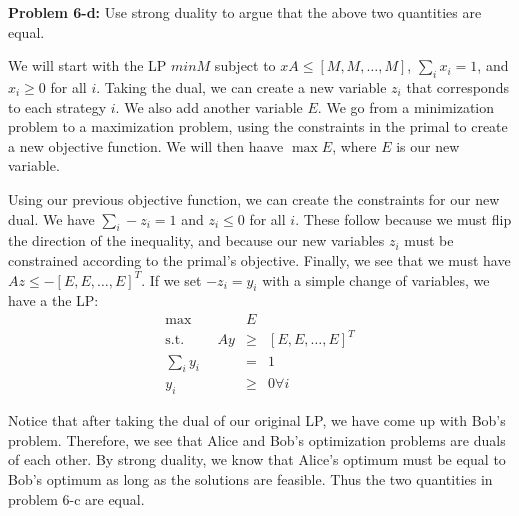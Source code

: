 \documentclass[psamsfonts]{amsart}
\newenvironment{sol}{\vspace{0.25cm}{\large \bfseries Solution:}}{\qedsymbol}
\newenvironment{prob}[1]{\begin{framed}{\large \bfseries Problem #1:}}{\end{framed}}
\begin{document}
\begin{prob}{6-d}
Use strong duality to argue that the above two quantities are equal.
\end{prob}
\begin{sol}
We will start with the LP $min M$ subject to $xA \leq [M, M, \ldots, M]$, $\sum_{i} x_i = 1$, and $x_i \geq 0$ for all $i$. Taking the dual, we can create a new variable $z_i$ that corresponds to each strategy $i$. We also add another variable $E$. We go from a minimization problem to a maximization problem, using the constraints in the primal to create a new objective function. We will then haave $\max E$, where $E$ is our new variable. 

Using our previous objective function, we can create the constraints for our new dual. We have $\sum_{i} - z_i = 1$ and $z_i \leq 0$ for all $i$. These follow because we must flip the direction of the inequality, and because our new variables $z_i$ must be constrained according to the primal's objective. Finally, we see that we must have $Az \leq - [E, E, \ldots, E]^T$. If we set $-z_i = y_i$ with a simple change of variables, we have a the LP:
\begin{eqnarray}
\max &E& \\
\text{s.t.} \hspace{1cm} Ay &\geq& [E, E, \ldots, E]^T \\
\sum_{i} y_i &=& 1 \\
y_i &\geq& 0 \forall i
\end{eqnarray}

Notice that after taking the dual of our original LP, we have come up with Bob's problem. Therefore, we see that Alice and Bob's optimization problems are duals of each other. By strong duality, we know that Alice's optimum must be equal to Bob's optimum as long as the solutions are feasible. Thus the two quantities in problem 6-c are equal. 
\end{sol}
\end{document}
